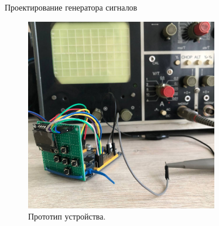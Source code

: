 \documentclass[10pt]{beamer}
\begin{document}
\begin{frame}{Проектирование генератора сигналов}
  \begin{figure}
  \includegraphics[width=0.75\textwidth]{m2}
  \caption{Прототип устройства.}
  \end{figure}
\end{frame}
\end{document}
